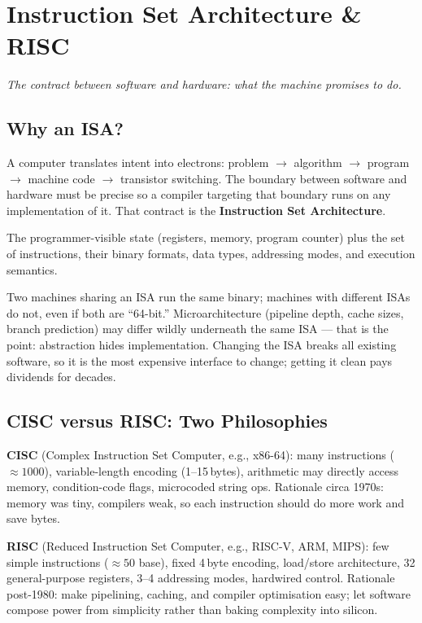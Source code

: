 \chapter{Instruction Set Architecture \& RISC}\label{ch:isa}
\begin{center}\small\textit{The contract between software and hardware: what the machine promises to do.}\end{center}

\section{Why an ISA?}
A computer translates intent into electrons: problem $\to$ algorithm $\to$ program $\to$ machine code $\to$ transistor switching.
The boundary between software and hardware must be precise so a compiler targeting that boundary runs on any
implementation of it. That contract is the \textbf{Instruction Set Architecture}.

\begin{definition}[ISA]
The programmer-visible state (registers, memory, program counter) plus the set of instructions, their binary formats,
data types, addressing modes, and execution semantics.
\end{definition}
Two machines sharing an ISA run the same binary; machines with different ISAs do not, even if both are ``64-bit.''
Microarchitecture (pipeline depth, cache sizes, branch prediction) may differ wildly underneath the same ISA ---
that is the point: abstraction hides implementation. Changing the ISA breaks all existing software, so it is
the most expensive interface to change; getting it clean pays dividends for decades.

\section{CISC versus RISC: Two Philosophies}
\textbf{CISC} (Complex Instruction Set Computer, e.g., x86-64): many instructions ($\approx 1000$), variable-length
encoding (1--15\,bytes), arithmetic may directly access memory, condition-code flags, microcoded string ops.
Rationale circa 1970s: memory was tiny, compilers weak, so each instruction should do more work and save bytes.

\textbf{RISC} (Reduced Instruction Set Computer, e.g., RISC-V, ARM, MIPS): few simple instructions ($\approx 50$ base),
fixed 4\,byte encoding, load/store architecture, 32 general-purpose registers, 3--4 addressing modes, hardwired control.
Rationale post-1980: make pipelining, caching, and compiler optimisation easy; let software compose power from
simplicity rather than baking complexity into silicon.

